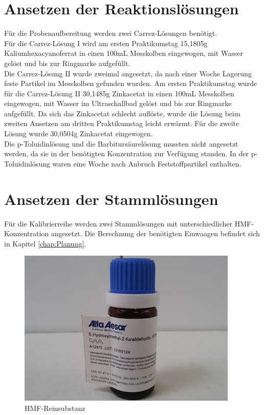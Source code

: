 \section{Ansetzen der Reaktionslösungen}

Für die Probenaufbereitung werden zwei Carrez-Lösungen benötigt.\\ 
Für die Carrez-Lösung I wird am ersten Praktikumstag 15,1805g Kaliumhexacyanoferrat in einen 100mL Messkolben eingewogen, mit Wasser gelöst und bis zur Ringmarke aufgefüllt.\\ 
Die Carrez-Lösung II wurde zweimal angesetzt, da nach einer Woche Lagerung feste Partikel im Messkolben gefunden wurden. Am ersten Praktikumstag wurde für die Carrez-Lösung II 30,1485g Zinkacetat in einen 100mL Messkolben eingewogen, mit Wasser im Ultraschallbad gelöst und bis zur Ringmarke aufgefüllt. Da sich das Zinkacetat schlecht auflöste, wurde die Lösung beim zweiten Ansetzen am dritten Praktikumstag leicht erwärmt. Für die zweite Lösung wurde 30,0504g Zinkacetat eingewogen.\\ 
Die p-Toluidinlösung und die Barbitursäurelösung mussten nicht angesetzt werden, da sie in der benötigten Konzentration zur Verfügung standen. In der p-Toluidinlösung waren eine Woche nach Anbruch Feststoffpartikel enthalten.

\section{Ansetzen der Stammlösungen}

Für die Kalibrierreihe werden zwei Stammlösungen mit unterschiedlicher HMF-Konzentration angesetzt. Die Berechnung der benötigten Einwaagen befindet sich in Kapitel \ref{chap:Planung}.

\begin{figure}[htbp]
    \centering
        \includegraphics{../Bilder/20150504_140727.jpg}
    \caption{HMF-Reinsubstanz}
    \label{fig:HMF-Reinsubstanz}
\end{figure}
    
